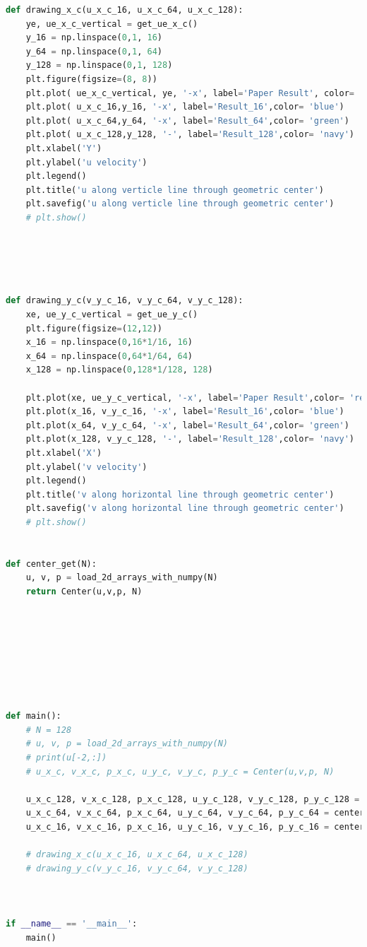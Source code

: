 \documentclass[12pt]{article}
\begin{document}
\begin{scriptsize}
\begin{lstlisting}[language=python,caption={Post Operator:}]
def drawing_x_c(u_x_c_16, u_x_c_64, u_x_c_128):
    ye, ue_x_c_vertical = get_ue_x_c()
    y_16 = np.linspace(0,1, 16)
    y_64 = np.linspace(0,1, 64)
    y_128 = np.linspace(0,1, 128)
    plt.figure(figsize=(8, 8))
    plt.plot( ue_x_c_vertical, ye, '-x', label='Paper Result', color= 'red')
    plt.plot( u_x_c_16,y_16, '-x', label='Result_16',color= 'blue')
    plt.plot( u_x_c_64,y_64, '-x', label='Result_64',color= 'green')
    plt.plot( u_x_c_128,y_128, '-', label='Result_128',color= 'navy')
    plt.xlabel('Y')
    plt.ylabel('u velocity')
    plt.legend()
    plt.title('u along verticle line through geometric center')
    plt.savefig('u along verticle line through geometric center')
    # plt.show()



    

def drawing_y_c(v_y_c_16, v_y_c_64, v_y_c_128):
    xe, ue_y_c_vertical = get_ue_y_c()
    plt.figure(figsize=(12,12))
    x_16 = np.linspace(0,16*1/16, 16)
    x_64 = np.linspace(0,64*1/64, 64)
    x_128 = np.linspace(0,128*1/128, 128)

    plt.plot(xe, ue_y_c_vertical, '-x', label='Paper Result',color= 'red')
    plt.plot(x_16, v_y_c_16, '-x', label='Result_16',color= 'blue')
    plt.plot(x_64, v_y_c_64, '-x', label='Result_64',color= 'green')
    plt.plot(x_128, v_y_c_128, '-', label='Result_128',color= 'navy')
    plt.xlabel('X')
    plt.ylabel('v velocity')
    plt.legend()
    plt.title('v along horizontal line through geometric center')
    plt.savefig('v along horizontal line through geometric center')
    # plt.show()


def center_get(N):
    u, v, p = load_2d_arrays_with_numpy(N)
    return Center(u,v,p, N)








def main():
    # N = 128
    # u, v, p = load_2d_arrays_with_numpy(N)
    # print(u[-2,:])
    # u_x_c, v_x_c, p_x_c, u_y_c, v_y_c, p_y_c = Center(u,v,p, N)

    u_x_c_128, v_x_c_128, p_x_c_128, u_y_c_128, v_y_c_128, p_y_c_128 = center_get(128)
    u_x_c_64, v_x_c_64, p_x_c_64, u_y_c_64, v_y_c_64, p_y_c_64 = center_get(64)
    u_x_c_16, v_x_c_16, p_x_c_16, u_y_c_16, v_y_c_16, p_y_c_16 = center_get(16)

    # drawing_x_c(u_x_c_16, u_x_c_64, u_x_c_128)
    # drawing_y_c(v_y_c_16, v_y_c_64, v_y_c_128)



if __name__ == '__main__':
    main()


\end{lstlisting}
\end{scriptsize}
\end{document}
